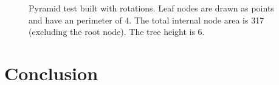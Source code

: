\documentclass{article}
\begin{document}
\begin{figure}
	\begin{center}
		
	\end{center}
	\caption{ Pyramid test built with rotations. Leaf nodes are drawn as points and have an perimeter of 4. The total internal node area is 317 (excluding the root node). The tree height is 6. }
	\label{fig:pyramid_rotate}
\end{figure}

\section{Conclusion}



\end{document}
